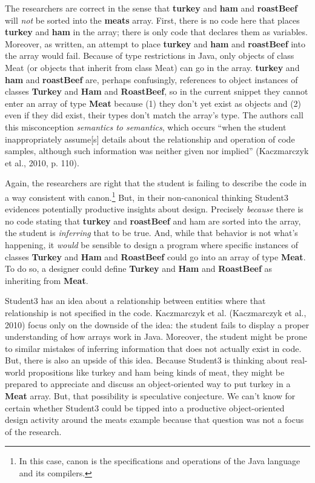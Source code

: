 The researchers are correct in the sense that \textbf{turkey} and
\textbf{ham} and \textbf{roastBeef} will \emph{not} be sorted into the
\textbf{meats} array. First, there is no code here that places
\textbf{turkey} and \textbf{ham} in the array; there is only code that
declares them as variables. Moreover, as written, an attempt to place
\textbf{turkey} and \textbf{ham} and \textbf{roastBeef} into the array
would fail. Because of type restrictions in Java, only objects of class
Meat (or objects that inherit from class Meat) can go in the array.
\textbf{turkey} and \textbf{ham} and \textbf{roastBeef} are, perhaps
confusingly, references to object instances of classes \textbf{Turkey}
and \textbf{Ham} and \textbf{RoastBeef}, so in the current snippet they
cannot enter an array of type \textbf{Meat} because (1) they don't yet
exist as objects and (2) even if they did exist, their types don't match
the array's type. The authors call this misconception \emph{semantics to
semantics}, which occurs ``when the student inappropriately
assume{[}s{]} details about the relationship and operation of code
samples, although such information was neither given nor implied''
(Kaczmarczyk et al., 2010, p. 110).

Again, the researchers are right that the student is failing to describe
the code in a way consistent with canon.\footnote{In this case, canon is
  the specifications and operations of the Java language and its
  compilers.} But, in their non-canonical thinking Student3 evidences
potentially productive insights about design. Precisely \emph{because}
there is no code stating that \textbf{turkey} and \textbf{roastBeef} and
ham are sorted into the array, the student is \emph{inferring} that to
be true. And, while that behavior is not what's happening, it
\emph{would} be sensible to design a program where specific instances of
classes \textbf{Turkey} and \textbf{Ham} and \textbf{RoastBeef} could go
into an array of type \textbf{Meat}. To do so, a designer could define
\textbf{Turkey} and \textbf{Ham} and \textbf{RoastBeef} as inheriting
from \textbf{Meat}.

Student3 has an idea about a relationship between entities where that
relationship is not specified in the code. Kaczmarczyk et al.
(Kaczmarczyk et al., 2010) focus only on the downside of the idea: the
student fails to display a proper understanding of how arrays work in
Java. Moreover, the student might be prone to similar mistakes of
inferring information that does not actually exist in code. But, there
is also an upside of this idea. Because Student3 is thinking about
real-world propositions like turkey and ham being kinds of meat, they
might be prepared to appreciate and discuss an object-oriented way to
put turkey in a \textbf{Meat} array. But, that possibility is
speculative conjecture. We can't know for certain whether Student3 could
be tipped into a productive object-oriented design activity around the
meats example because that question was not a focus of the research.

